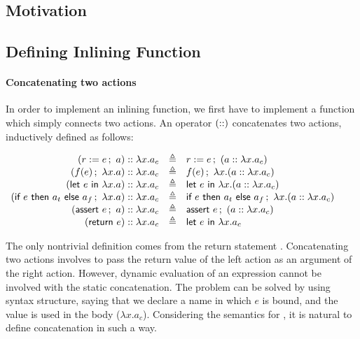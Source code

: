\subsection{Motivation}

\subsection{Defining Inlining Function}

\paragraph{Concatenating two actions}
In order to implement an inlining function, we first have to implement
a function which simply connects two actions. An operator
$(\concatsymb)$ concatenates two actions, inductively defined as
follows:

\begin{definition}
  \label{def-concataction}
  \mbox{}
  \begin{center}
    \begin{math}
      \begin{array}{rcl}
        \concataction{(\actwrite{r}{e}{a})}{a_c} & \triangleq & \actwrite{r}{e}{(\concataction{a}{a_c})} \\
        \concataction{(\actcall{x}{f}{e}{a})}{a_c} & \triangleq & \actcall{x}{f}{e}{(\concataction{a}{a_c})} \\
        \concataction{(\actlet{e}{x}{a})}{a_c} & \triangleq & \actlet{e}{x}{(\concataction{a}{a_c})} \\
        \concataction{(\actifelse{e}{a_t}{a_f}{x}{a})}{a_c} & \triangleq &
        \actifelse{e}{a_t}{a_f}{x}{(\concataction{a}{a_c})} \\
        \concataction{(\actassert{e}{a})}{a_c} & \triangleq & \actassert{e}{(\concataction{a}{a_c})} \\
        \concataction{(\actret{e})}{a_c} & \triangleq & \actlet{e}{x}{a_c} \\
      \end{array}
    \end{math}
  \end{center}
\end{definition}

The only nontrivial definition comes from the return statement
. Concatenating two actions involves to pass the return
value of the left action as an argument of the right action. However,
dynamic evaluation of an expression cannot be involved with the static
concatenation. The problem can be solved by using \wordlet{} syntax
structure, saying that we declare a name in which $e$ is bound, and
the value is used in the body ($\lambda x.a_c$). Considering the
semantics for \wordlet{}, it is natural to define concatenation in
such a way.


